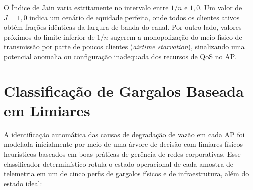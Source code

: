 O Índice de Jain varia estritamente no intervalo entre $1/n$ e $1,0$. Um valor de $J = 1,0$ indica um cenário de equidade perfeita, onde todos os clientes ativos obtêm frações idênticas da largura de banda do canal. Por outro lado, valores próximos do limite inferior de $1/n$ sugerem a monopolização do meio físico de transmissão por parte de poucos clientes (\textit{airtime starvation}), sinalizando uma potencial anomalia ou configuração inadequada dos recursos de QoS no AP.

\section{Classificação de Gargalos Baseada em Limiares}
\label{sec:classificacao_limiares}

A identificação automática das causas de degradação de vazão em cada AP foi modelada inicialmente por meio de uma árvore de decisão com limiares físicos heurísticos baseados em boas práticas de gerência de redes corporativas. Esse classificador determinístico rotula o estado operacional de cada amostra de telemetria em um de cinco perfis de gargalos físicos e de infraestrutura, além do estado ideal:

